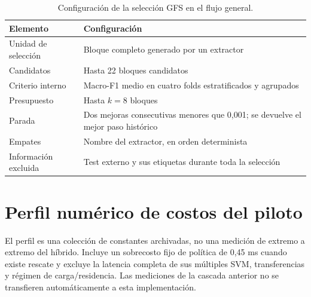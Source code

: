\begin{table}[!htbp]
\centering
\caption{Configuración de la selección GFS en el flujo general.}
\label{tab:config-gfs}
\fontsize{9}{11}\selectfont
\begin{tabular}{lp{8.4cm}}
\toprule
Elemento & Configuración \\
\midrule
Unidad de selección & Bloque completo generado por un extractor \\
Candidatos & Hasta 22 bloques candidatos \\
Criterio interno & Macro-F1 medio en cuatro folds estratificados y agrupados \\
Presupuesto & Hasta $k=8$ bloques \\
Parada & Dos mejoras consecutivas menores que 0,001; se devuelve el mejor paso histórico \\
Empates & Nombre del extractor, en orden determinista \\
Información excluida & Test externo y sus etiquetas durante toda la selección \\
\bottomrule
\end{tabular}
\end{table}
\FloatBarrier



\section{Perfil numérico de costos del piloto}

El perfil es una colección de constantes archivadas, no una medición de extremo a extremo del híbrido. Incluye un sobrecosto fijo de política de 0,45 ms cuando existe rescate y excluye la latencia completa de sus múltiples SVM, transferencias y régimen de carga/residencia. Las mediciones de la cascada anterior no se transfieren automáticamente a esta implementación.
